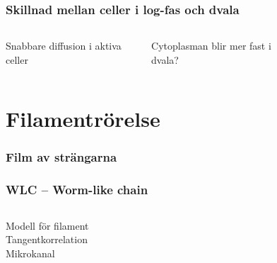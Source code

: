 \documentclass[swedish]{beamer}
\begin{document}
\begin{frame}
\frametitle{Skillnad mellan celler i log-fas och dvala}
\begin{columns}


Snabbare diffusion i aktiva celler
\vspace{1cm}

Cytoplasman blir mer fast i dvala?




\begin{figure} %
\resizebox{1\textwidth}{!}{
}
\end{figure}

\end{columns}
\end{frame}


\section{Filamentrörelse}

\begin{frame}
\frametitle{Film av strängarna}

\centering
{}


\end{frame}




\begin{frame}
\frametitle{WLC -- Worm-like chain}
 \begin{columns}[c]

 Modell för filament
\\[8mm]
 Tangentkorrelation
\\[8mm]
 Mikrokanal


\begin{figure}

\end{figure}

\end{columns}
    
\end{frame}
\end{document}
